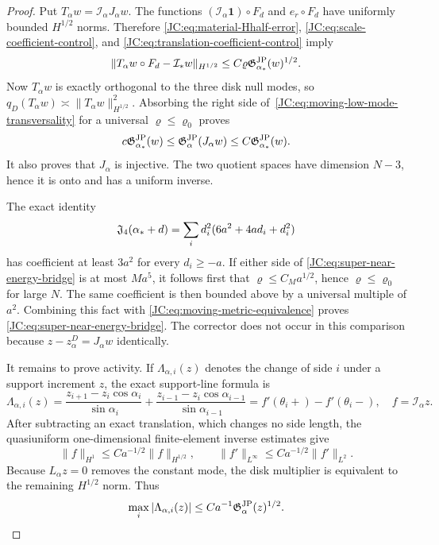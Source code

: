 \begin{proof}
Put $T_\alpha w=\mathcal I_\alpha J_\alpha w$.  The functions
$(\mathcal I_\alpha\mathbf1)\circ F_d$ and $e_r\circ F_d$ have uniformly
bounded $H^{1/2}$ norms.  Therefore
\eqref{JC:eq:material-Hhalf-error},
\eqref{JC:eq:scale-coefficient-control}, and
\eqref{JC:eq:translation-coefficient-control} imply
\begin{equation}\label{JC:eq:moving-low-mode-transversality}
 \|T_\alpha w\circ F_d-\mathcal I_*w\|_{H^{1/2}}
 \le C\varrho\mathfrak G^{\rm JP}_{\alpha_*}(w)^{1/2}.
\end{equation}
Now $T_\alpha w$ is exactly orthogonal to the three disk null modes, so
$q_D(T_\alpha w)\asymp\|T_\alpha w\|_{H^{1/2}}^2$.  Absorbing the right
side of~\eqref{JC:eq:moving-low-mode-transversality} for a universal
$\varrho\le\varrho_0$ proves
\begin{equation}\label{JC:eq:moving-metric-equivalence}
 c\mathfrak G^{\rm JP}_{\alpha_*}(w)\le
 \mathfrak G^{\rm JP}_\alpha(J_\alpha w)\le C\mathfrak G^{\rm JP}_{\alpha_*}(w).
\end{equation}
It also proves that $J_\alpha$ is injective.  The two quotient spaces
have dimension $N-3$, hence it is onto and has a uniform inverse.

The exact identity
\[
 \mathfrak J_4(\alpha_*+d)
 =\sum_i d_i^2(6a^2+4ad_i+d_i^2)
\]
has coefficient at least $3a^2$ for every $d_i\ge-a$.  If either side of
\eqref{JC:eq:super-near-energy-bridge} is at most $Ma^5$, it follows first
that $\varrho\le C_Ma^{1/2}$, hence $\varrho\le\varrho_0$ for large $N$.
The same coefficient is then bounded above by a universal multiple of
$a^2$.  Combining this fact with
\eqref{JC:eq:moving-metric-equivalence} proves
\eqref{JC:eq:super-near-energy-bridge}.  The corrector does not occur in
this comparison because $z-z_\alpha^D=J_\alpha w$ identically.

It remains to prove activity.  If $\Lambda_{\alpha,i}(z)$ denotes the
change of side $i$ under a support increment $z$, the exact support-line
formula is
\begin{equation}\label{JC:eq:exact-side-length-jump}
 \Lambda_{\alpha,i}(z)=
 \frac{z_{i+1}-z_i\cos\alpha_i}{\sin\alpha_i}
 +\frac{z_{i-1}-z_i\cos\alpha_{i-1}}{\sin\alpha_{i-1}}
 =f'(\theta_i+)-f'(\theta_i-),
 \quad f=\mathcal I_\alpha z.
\end{equation}
After subtracting an exact translation, which changes no side length,
the quasiuniform one-dimensional finite-element inverse estimates give
\[
 \|f\|_{H^1}\le Ca^{-1/2}\|f\|_{H^{1/2}},
 \qquad
 \|f'\|_{L^\infty}\le Ca^{-1/2}\|f'\|_{L^2}.
\]
Because $L_\alpha z=0$ removes the constant mode, the disk multiplier is
equivalent to the remaining $H^{1/2}$ norm.  Thus
\begin{equation}\label{JC:eq:side-length-inverse}
 \max_i|\Lambda_{\alpha,i}(z)|
 \le Ca^{-1}\mathfrak G^{\rm JP}_\alpha(z)^{1/2}.
\end{equation}


\end{proof}

